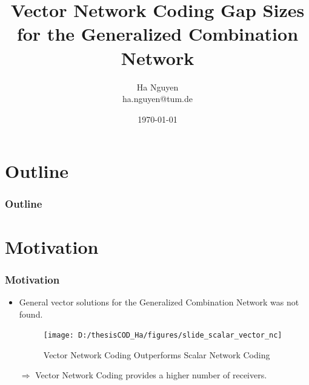 \documentclass[c]{beamer}
\title[Vector Network Coding Gap Sizes for the Generalized Combination Network]{Vector Network Coding Gap Sizes for the Generalized Combination Network}
\author[Ha Nguyen]{Ha Nguyen\\ {\footnotesize \hspace{1mm} ha.nguyen@tum.de} }
\date{\today}
\begin{document}
\begin{frame}
	\titlepage
\end{frame}

\section*{Outline}
\begin{frame}
	\frametitle{Outline}
	\tableofcontents
\end{frame}


\section{Motivation}
\begin{frame}[c]
\frametitle{Motivation}
	\begin{itemize}%
		\item General vector solutions for the Generalized Combination Network was not found. 

	\begin{example}
		\begin{figure}

		\caption{Vector Network Coding Outperforms Scalar Network Coding}

		\centering{}\texttt{[image: D:/thesisCOD\_Ha/figures/slide\_scalar\_vector\_nc]}
		\end{figure}
	\end{example}

		\item[$\Longrightarrow$] Vector Network Coding provides a higher number of receivers.
	\end{itemize}
\end{frame}
\end{document}
